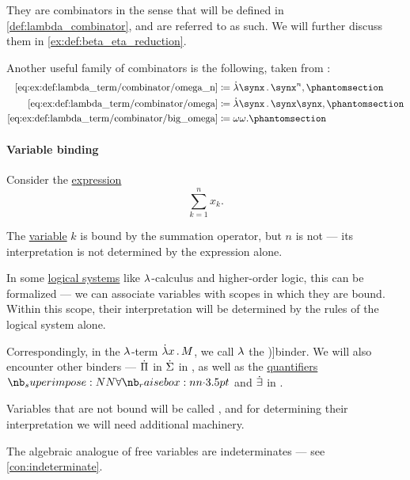 \begin{example}
\begin{thmenum}
    They are combinators in the sense that will be defined in \cref{def:lambda_combinator}, and are referred to as such. We will further discuss them in \cref{ex:def:beta_eta_reduction}.

    Another useful family of combinators is the following, taken from \cite[\S 3.1.21; \S 6.2.1]{Barendregt1984LambdaCalculus}:
    \begin{align*}
      \ref{eq:ex:def:lambda_term/combinator/omega_n}   &\coloneqq \qabs \synx \synx^n,     \taglabel[\ensuremath{ \omega_n }]{eq:ex:def:lambda_term/combinator/omega_n} \\
      \ref{eq:ex:def:lambda_term/combinator/omega}     &\coloneqq \qabs \synx \synx \synx, \taglabel[\ensuremath{ \omega }]{eq:ex:def:lambda_term/combinator/omega} \\
      \ref{eq:ex:def:lambda_term/combinator/big_omega} &\coloneqq \omega \omega.           \taglabel[\ensuremath{ \Omega }]{eq:ex:def:lambda_term/combinator/big_omega}
    \end{align*}
  \end{thmenum}
\end{example}

\paragraph{Variable binding}

\begin{concept}\label{con:variable_binding}
  Consider the \hyperref[con:expression]{expression}
  \begin{equation*}
    \sum_{k=1}^n x_k.
  \end{equation*}

  The \hyperref[con:variable]{variable} \( k \) is bound by the summation operator, but \( n \) is not --- its interpretation is not determined by the expression alone.

  In some \hyperref[con:logical_system]{logical systems} like \( {\mathrm \lambda} \)-calculus and higher-order logic, this can be formalized --- we can associate variables with scopes in which they are bound. Within this scope, their interpretation will be determined by the rules of the logical system alone.

  Correspondingly, in the \( {\mathrm \lambda} \)-term \( \qabs x M \), we call \( {\mathrm \lambda} \) the \term[en=binder (\cite[23]{UnivalentFoundationsProgram2013HoTT})]{binder}. We will also encounter other binders --- \( \dot{\Pi} \) in \( \dot{\Sigma} \) in , as well as the \hyperref[def:predicate_logic_alphabet/quantifiers]{quantifiers} \( \synforall \) and \( \mathord{\dot{\exists}} \) in .

  Variables that are not bound will be called , and for determining their interpretation we will need additional machinery.
\end{concept}
\begin{comments}
  \item The algebraic analogue of free variables are indeterminates --- see \cref{con:indeterminate}.
\end{comments}

